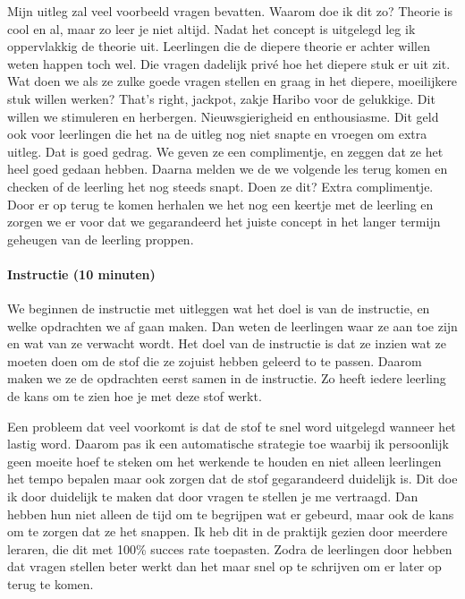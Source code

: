                     \bigskip
                    
                    \noindent Mijn uitleg zal veel voorbeeld vragen bevatten. Waarom doe ik dit zo? Theorie is cool en al, maar zo leer je niet altijd. Nadat het concept is uitgelegd leg ik oppervlakkig de theorie uit. Leerlingen die de diepere theorie er achter willen weten happen toch wel. Die vragen dadelijk privé hoe het diepere stuk er uit zit. Wat doen we als ze zulke goede vragen stellen en graag in het diepere, moeilijkere stuk willen werken? That's right, jackpot, zakje Haribo voor de gelukkige. Dit willen we stimuleren en herbergen. Nieuwsgierigheid en enthousiasme. Dit geld ook voor leerlingen die het na de uitleg nog niet snapte en vroegen om extra uitleg. Dat is goed gedrag. We geven ze een complimentje, en zeggen dat ze het heel goed gedaan hebben. Daarna melden we de we volgende les terug komen en checken of de leerling het nog steeds snapt. Doen ze dit? Extra complimentje. Door er op terug te komen herhalen we het nog een keertje met de leerling en zorgen we er voor dat we gegarandeerd het juiste concept in het langer termijn geheugen van de leerling proppen.
                    
                \paragraph{Instructie (10 minuten)}
                    We beginnen de instructie met uitleggen wat het doel is van de instructie, en welke opdrachten we af gaan maken. Dan weten de leerlingen waar ze aan toe zijn en wat van ze verwacht wordt. Het doel van de instructie is dat ze inzien wat ze moeten doen om de stof die ze zojuist hebben geleerd to te passen. Daarom maken we ze de opdrachten eerst samen in de instructie. Zo heeft iedere leerling de kans om te zien hoe je met deze stof werkt.

                    \bigskip
                    
                    \noindent Een probleem dat veel voorkomt is dat de stof te snel word uitgelegd wanneer het lastig word. Daarom pas ik een automatische strategie toe waarbij ik persoonlijk geen moeite hoef te steken om het werkende te houden en niet alleen leerlingen het tempo bepalen maar ook zorgen dat de stof gegarandeerd duidelijk is. Dit doe ik door duidelijk te maken dat door vragen te stellen je me vertraagd. Dan hebben hun niet alleen de tijd om te begrijpen wat er gebeurd, maar ook de kans om te zorgen dat ze het snappen. Ik heb dit in de praktijk gezien door meerdere leraren, die dit met 100\% succes rate toepasten.\cite{succesfull-instructions} Zodra de leerlingen door hebben dat vragen stellen beter werkt dan het maar snel op te schrijven om er later op terug te komen.

